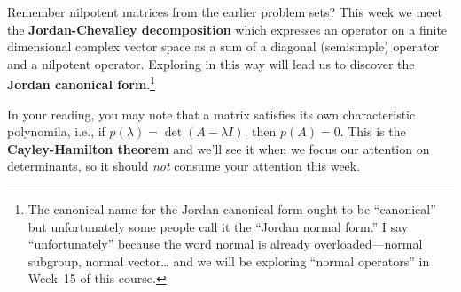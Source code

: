\documentclass{homework}
\begin{document}
Remember nilpotent matrices from the earlier problem sets?  This week
we meet the \textbf{Jordan-Chevalley decomposition} which expresses an
operator on a finite dimensional complex vector space as a sum of a
diagonal (semisimple) operator and a nilpotent operator.  Exploring in
this way will lead us to discover the \textbf{Jordan canonical
  form}.\footnote{The canonical name for the Jordan canonical form
  ought to be ``canonical'' but unfortunately some people call it the
  ``Jordan normal form.''  I say ``unfortunately'' because the word
  normal is already overloaded---normal subgroup, normal vector\ldots
  and we will be exploring ``normal operators'' in Week~15 of this
  course.}

In your reading, you may note that a matrix satisfies its own characteristic
polynomila, i.e., if $p(\lambda) = \det(A - \lambda I)$, then
$p(A) = 0$.  This is the \textbf{Cayley-Hamilton theorem} and we'll
see it when we focus our attention on determinants, so it should
\textit{not} consume your attention this week.


\end{document}
